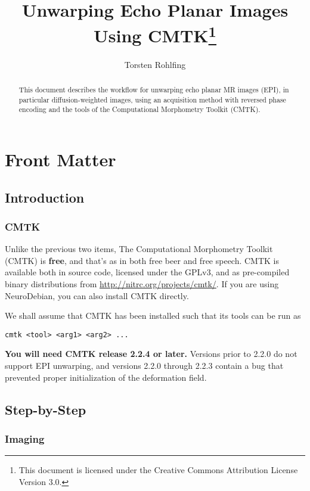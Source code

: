 \documentclass{InsightArticle}
\title{Unwarping Echo Planar Images Using CMTK\footnote{This document is licensed under
    the Creative Commons Attribution License Version 3.0.}}
\author{Torsten Rohlfing}
\begin{document}
\maketitle

\ifhtml
\chapter*{Front Matter\label{front}}
\fi


\begin{abstract}
\noindent This document describes the workflow for unwarping echo planar MR
images (EPI), in particular diffusion-weighted images, using an acquisition method
with reversed phase encoding and the tools of the Computational Morphometry
Toolkit (CMTK).
\end{abstract}

\tableofcontents

\clearpage
\section{Introduction}

\cite{HollKupeDale:2010}

\subsection{CMTK}

Unlike the previous two items, The Computational Morphometry Toolkit (CMTK) is
{\bf free}, and that's as in both free beer and free speech. CMTK is available
both in source code, licensed under the GPLv3, and as pre-compiled binary
distributions from \url{http://nitrc.org/projects/cmtk/}. If you are using
NeuroDebian, you can also install CMTK directly.

We shall assume that CMTK has been installed such that its tools can be run as
\begin{verbatim}
cmtk <tool> <arg1> <arg2> ...
\end{verbatim}

{\bf You will need CMTK release 2.2.4 or later.} Versions prior to 2.2.0 do not
  support EPI unwarping, and versions 2.2.0 through 2.2.3 contain a bug that
  prevented proper initialization of the deformation field.

\section{Step-by-Step}

\subsection{Imaging}
\end{document}
